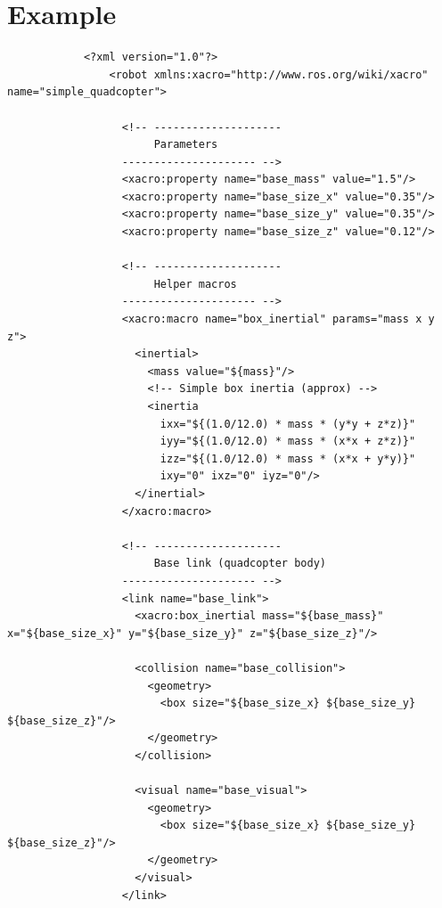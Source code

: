 \documentclass[a4paper]{article}
\title{}
\date{}
\begin{document}
    \maketitle
    
    \section{Example}
        \begin{verbatim}
            <?xml version="1.0"?>
                <robot xmlns:xacro="http://www.ros.org/wiki/xacro" name="simple_quadcopter">
                
                  <!-- --------------------
                       Parameters
                  --------------------- -->
                  <xacro:property name="base_mass" value="1.5"/>
                  <xacro:property name="base_size_x" value="0.35"/>
                  <xacro:property name="base_size_y" value="0.35"/>
                  <xacro:property name="base_size_z" value="0.12"/>
                
                  <!-- --------------------
                       Helper macros
                  --------------------- -->
                  <xacro:macro name="box_inertial" params="mass x y z">
                    <inertial>
                      <mass value="${mass}"/>
                      <!-- Simple box inertia (approx) -->
                      <inertia
                        ixx="${(1.0/12.0) * mass * (y*y + z*z)}"
                        iyy="${(1.0/12.0) * mass * (x*x + z*z)}"
                        izz="${(1.0/12.0) * mass * (x*x + y*y)}"
                        ixy="0" ixz="0" iyz="0"/>
                    </inertial>
                  </xacro:macro>
                
                  <!-- --------------------
                       Base link (quadcopter body)
                  --------------------- -->
                  <link name="base_link">
                    <xacro:box_inertial mass="${base_mass}" x="${base_size_x}" y="${base_size_y}" z="${base_size_z}"/>
                
                    <collision name="base_collision">
                      <geometry>
                        <box size="${base_size_x} ${base_size_y} ${base_size_z}"/>
                      </geometry>
                    </collision>
                
                    <visual name="base_visual">
                      <geometry>
                        <box size="${base_size_x} ${base_size_y} ${base_size_z}"/>
                      </geometry>
                    </visual>
                  </link>
                

\end{verbatim}
\end{document}
